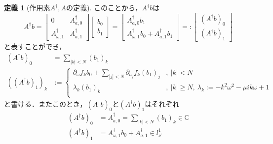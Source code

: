 \documentclass[11pt,a4paper,titlepage]{jsreport}
\theoremstyle{definition}
\newtheorem{dfn}{定義}
\begin{document}
\begin{dfn}[作用素$A^\dagger,A$の定義]
  このことから，$A^\dagger b$は
  \begin{equation*}
    A^\dagger b = \begin{bmatrix}
      0                    & A^\dagger_{a,0} \\
      A^\dagger_{\omega,1} & A^\dagger_{a,1}
    \end{bmatrix}
    \begin{bmatrix}
      b_0 \\
      b_1
    \end{bmatrix}
    = \begin{bmatrix}
      A_{a,0}^\dagger b_1 \\
      A_{\omega,1}^\dagger b_0 + A_{a,1}^\dagger b_1
    \end{bmatrix}
    =: \begin{bmatrix}
      \left(A^\dagger b\right)_0 \\
      \left(A^\dagger b\right)_1
    \end{bmatrix}
  \end{equation*}
  と表すことができ，
  \begin{align*}
    \left(A^\dagger b\right)_0                & = \sum_{|k|<N} (b_1)_k                                                                                                             \\
    \left(\left(A^\dagger b\right)_1\right)_k & := \begin{cases}
                                                     \partial_\omega f_k b_0 + \sum_{|j|<N} \partial_{a_j} f_k (b_1)_j & ,\ |k|<N                                                    \\
                                                     \lambda_k (b_1)_k                                                 & ,\ |k|\geq N,\ \lambda_k := -k^2\omega^2 - \mu ik\omega + 1 \\
                                                   \end{cases}
  \end{align*}
  と書ける．またこのとき，$(A^\dagger b)_0$と$(A^\dagger b)_1$はそれぞれ
  \begin{align*}
    \left(A^\dagger b\right)_0 & = A_{a,0}^\dagger = \sum_{|k|<N} (b_1)_k \in \mathbb{C}           \\
    \left(A^\dagger b\right)_1 & = A_{\omega,1}^\dagger b_0 + A_{a,1}^\dagger \in l_{\nu^\prime}^1
  \end{align*}


\end{dfn}
\end{document}
